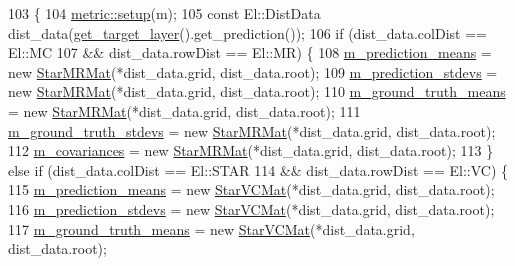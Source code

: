 \begin{DoxyCode}
103                                                \{
104   \hyperlink{classlbann_1_1metric_a898d23e410297378db2fe9f8d1754fe0}{metric::setup}(m);
105   \textcolor{keyword}{const} El::DistData dist\_data(\hyperlink{classlbann_1_1metric_aba7f7a12aeba6619f7b4330e9075f76e}{get\_target\_layer}().get\_prediction());
106   \textcolor{keywordflow}{if} (dist\_data.colDist == El::MC
107       && dist\_data.rowDist == El::MR) \{
108     \hyperlink{classlbann_1_1pearson__correlation__metric_ac664eebee2c3d3287848c570400bdddb}{m\_prediction\_means}    = \textcolor{keyword}{new} \hyperlink{base_8hpp_a638c3ca7c22f916d23415b234420b9f1}{StarMRMat}(*dist\_data.grid, dist\_data.root);
109     \hyperlink{classlbann_1_1pearson__correlation__metric_ad288c4206078866feb39a4f982d8e975}{m\_prediction\_stdevs}   = \textcolor{keyword}{new} \hyperlink{base_8hpp_a638c3ca7c22f916d23415b234420b9f1}{StarMRMat}(*dist\_data.grid, dist\_data.root);
110     \hyperlink{classlbann_1_1pearson__correlation__metric_aa67f395597bf6bbf9bd57645877f26a5}{m\_ground\_truth\_means}  = \textcolor{keyword}{new} \hyperlink{base_8hpp_a638c3ca7c22f916d23415b234420b9f1}{StarMRMat}(*dist\_data.grid, dist\_data.root);
111     \hyperlink{classlbann_1_1pearson__correlation__metric_a7ed5e7a1778d17f852f4277afcaa31ed}{m\_ground\_truth\_stdevs} = \textcolor{keyword}{new} \hyperlink{base_8hpp_a638c3ca7c22f916d23415b234420b9f1}{StarMRMat}(*dist\_data.grid, dist\_data.root);
112     \hyperlink{classlbann_1_1pearson__correlation__metric_aeabb941e22f2718a59103b7ec98a9c1e}{m\_covariances}         = \textcolor{keyword}{new} \hyperlink{base_8hpp_a638c3ca7c22f916d23415b234420b9f1}{StarMRMat}(*dist\_data.grid, dist\_data.root);
113   \} \textcolor{keywordflow}{else} \textcolor{keywordflow}{if} (dist\_data.colDist == El::STAR
114              && dist\_data.rowDist == El::VC) \{
115     \hyperlink{classlbann_1_1pearson__correlation__metric_ac664eebee2c3d3287848c570400bdddb}{m\_prediction\_means}    = \textcolor{keyword}{new} \hyperlink{base_8hpp_aa4ec814c4a8f15b4ea2b24b3af94ef23}{StarVCMat}(*dist\_data.grid, dist\_data.root);
116     \hyperlink{classlbann_1_1pearson__correlation__metric_ad288c4206078866feb39a4f982d8e975}{m\_prediction\_stdevs}   = \textcolor{keyword}{new} \hyperlink{base_8hpp_aa4ec814c4a8f15b4ea2b24b3af94ef23}{StarVCMat}(*dist\_data.grid, dist\_data.root);
117     \hyperlink{classlbann_1_1pearson__correlation__metric_aa67f395597bf6bbf9bd57645877f26a5}{m\_ground\_truth\_means}  = \textcolor{keyword}{new} \hyperlink{base_8hpp_aa4ec814c4a8f15b4ea2b24b3af94ef23}{StarVCMat}(*dist\_data.grid, dist\_data.root);

\end{DoxyCode}
